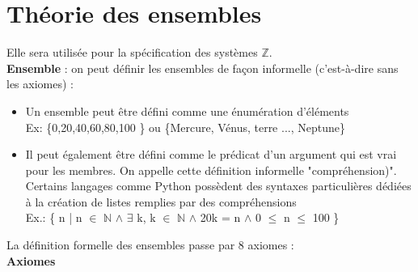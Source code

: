 \section{Théorie des ensembles}
Elle sera utilisée pour la spécification des systèmes $\mathbb{Z}$.\\

\textbf{Ensemble} : on peut définir les ensembles de façon informelle (c'est-à-dire sans les axiomes) : \\
\begin{itemize}
\item Un ensemble peut être défini comme une énumération d'éléments \\
Ex: \{0,20,40,60,80,100 \} ou \{Mercure, Vénus, terre ..., Neptune\}
\item Il peut également être défini comme le prédicat d'un argument qui est vrai pour les membres. On appelle cette définition informelle "compréhension)". Certains langages comme Python possèdent des syntaxes particulières dédiées à la création de listes remplies par des compréhensions\\
Ex.: \{ n | n $\in$ $\mathbb{N}$ $\wedge$ $\exists$ k, k $\in$ $\mathbb{N}$ $\wedge$ 20k = n $\wedge$ 0 $\leq$ n $\leq$ 100 \} \\
\end{itemize}
La définition formelle des ensembles passe par 8 axiomes :
\\
\textbf{Axiomes} \\

